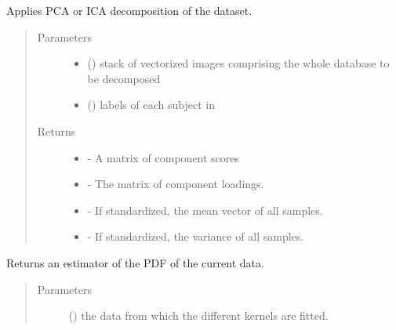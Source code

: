 \documentclass[letterpaper,10pt,english]{sphinxmanual}
\begin{document}
\begin{fulllineitems}
\begin{fulllineitems}
\label{\detokenize{api:brainSimulator.BrainSimulator.decompose}}
Applies PCA or ICA decomposition of the dataset.
\begin{quote}\begin{description}
\item[{Parameters}] \leavevmode\begin{itemize}
\item {} 
 () \textendash{} stack of vectorized images comprising the whole database to be decomposed

\item {} 
 () \textendash{} labels of each subject in 

\end{itemize}

\item[{Returns}] \leavevmode
\begin{itemize}
\item {} 
 - A matrix of component scores

\item {} 
 - The matrix of component loadings.

\item {} 
 - If standardized, the mean vector of all samples.

\item {} 
 - If standardized, the variance of all samples.

\end{itemize}


\end{description}\end{quote}

\end{fulllineitems}


\begin{fulllineitems}
\label{\detokenize{api:brainSimulator.BrainSimulator.estimateDensity}}
Returns an estimator of the PDF of the current data.
\begin{quote}\begin{description}
\item[{Parameters}] \leavevmode
{} () \textendash{} the data from which the different kernels are fitted.


\end{description}
\end{quote}
\end{fulllineitems}
\end{fulllineitems}
\end{document}
